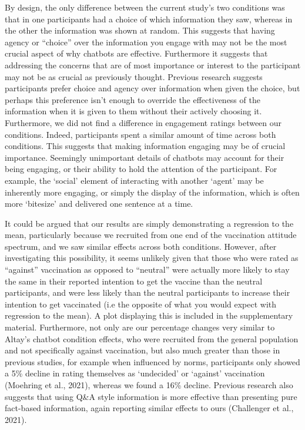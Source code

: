 \documentclass[
  english,
  ,jou,floatsintext]{apa6}
\begin{document}
By design, the only difference between the current study's two conditions was that in one participants had a choice of which information they saw, whereas in the other the information was shown at random. This suggests that having agency or ``choice'' over the information you engage with may not be the most crucial aspect of why chatbots are effective. Furthermore it suggests that addressing the concerns that are of most importance or interest to the participant may not be as crucial as previously thought. Previous research suggests participants prefer choice and agency over information when given the choice, but perhaps this preference isn't enough to override the effectiveness of the information when it is given to them without their actively choosing it. Furthermore, we did not find a difference in engagement ratings between our conditions. Indeed, participants spent a similar amount of time across both conditions. This suggests that making information engaging may be of crucial importance. Seemingly unimportant details of chatbots may account for their being engaging, or their ability to hold the attention of the participant. For example, the `social' element of interacting with another `agent' may be inherently more engaging, or simply the display of the information, which is often more `bitesize' and delivered one sentence at a time.

It could be argued that our results are simply demonstrating a regression to the mean, particularly because we recruited from one end of the vaccination attitude spectrum, and we saw similar effects across both conditions. However, after investigating this possibility, it seems unlikely given that those who were rated as ``against'' vaccination as opposed to ``neutral'' were actually more likely to stay the same in their reported intention to get the vaccine than the neutral participants, and were less likely than the neutral participants to increase their intention to get vaccinated (i.e the opposite of what you would expect with regression to the mean). A plot displaying this is included in the supplementary material. Furthermore, not only are our percentage changes very similar to Altay's chatbot condition effects, who were recruited from the general population and not specifically against vaccination, but also much greater than those in previous studies, for example when influenced by norms, participants only showed a 5\% decline in rating themselves as `undecided' or `against' vaccination (Moehring et al., 2021), whereas we found a 16\% decline. Previous research also suggests that using Q\&A style information is more effective than presenting pure fact-based information, again reporting similar effects to ours (Challenger et al., 2021).
\end{document}
